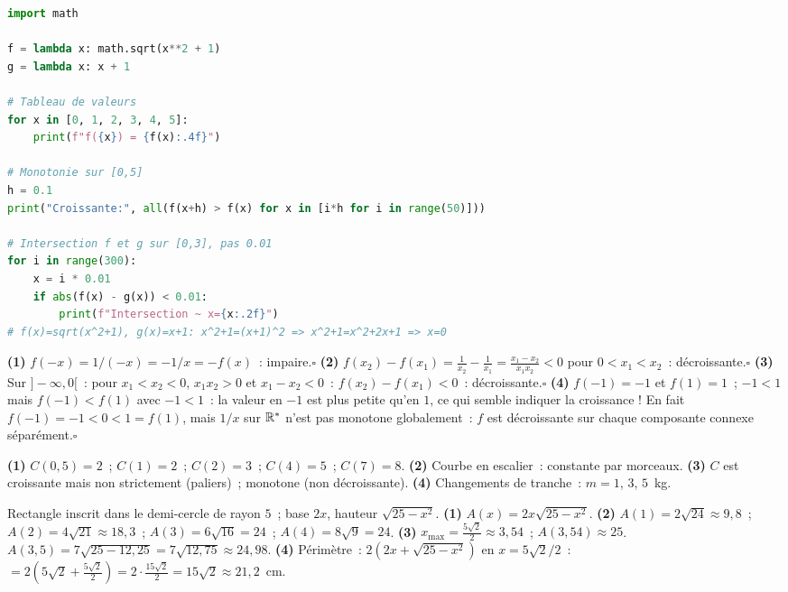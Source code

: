 
\begin{lstlisting}[language=Python]
import math

f = lambda x: math.sqrt(x**2 + 1)
g = lambda x: x + 1

# Tableau de valeurs
for x in [0, 1, 2, 3, 4, 5]:
    print(f"f({x}) = {f(x):.4f}")

# Monotonie sur [0,5]
h = 0.1
print("Croissante:", all(f(x+h) > f(x) for x in [i*h for i in range(50)]))

# Intersection f et g sur [0,3], pas 0.01
for i in range(300):
    x = i * 0.01
    if abs(f(x) - g(x)) < 0.01:
        print(f"Intersection ~ x={x:.2f}")
# f(x)=sqrt(x^2+1), g(x)=x+1: x^2+1=(x+1)^2 => x^2+1=x^2+2x+1 => x=0
\end{lstlisting}


\textbf{(1)} $f(-x)=1/(-x)=-1/x=-f(x)$~: impaire.\hfill$\square$
\textbf{(2)} $f(x_2)-f(x_1)=\frac{1}{x_2}-\frac{1}{x_1}=\frac{x_1-x_2}{x_1x_2}<0$ pour $0<x_1<x_2$~: d\'ecroissante.\hfill$\square$
\textbf{(3)} Sur $]-\infty,0[$~: pour $x_1<x_2<0$, $x_1x_2>0$ et $x_1-x_2<0$~:
$f(x_2)-f(x_1)<0$~: d\'ecroissante.\hfill$\square$
\textbf{(4)} $f(-1)=-1$ et $f(1)=1$~; $-1<1$ mais $f(-1)<f(1)$ avec $-1<1$~: la valeur en $-1$ est plus petite
qu'en $1$, ce qui semble indiquer la croissance ! En fait $f(-1)=-1<0<1=f(1)$, mais $1/x$ sur $\mathbb{R}^*$ n'est
pas monotone globalement~: $f$ est d\'ecroissante sur chaque composante connexe s\'epar\'ement.\hfill$\square$


\textbf{(1)} $C(0{,}5)=2$~; $C(1)=2$~; $C(2)=3$~; $C(4)=5$~; $C(7)=8$.
\textbf{(2)} Courbe en escalier~: constante par morceaux.
\textbf{(3)} $C$ est croissante mais non strictement (paliers)~; monotone (non d\'ecroissante).
\textbf{(4)} Changements de tranche~: $m=1$, $3$, $5$~kg.


Rectangle inscrit dans le demi-cercle de rayon $5$~; base $2x$, hauteur $\sqrt{25-x^2}$.
\textbf{(1)} $A(x)=2x\sqrt{25-x^2}$.
\textbf{(2)} $A(1)=2\sqrt{24}\approx9{,}8$~; $A(2)=4\sqrt{21}\approx18{,}3$~;
$A(3)=6\sqrt{16}=24$~; $A(4)=8\sqrt{9}=24$.
\textbf{(3)} $x_{\max}=\frac{5\sqrt{2}}{2}\approx3{,}54$~; $A(3{,}54)\approx25$.
$A(3{,}5)=7\sqrt{25-12{,}25}=7\sqrt{12{,}75}\approx24{,}98$.\checkmark
\textbf{(4)} P\'erim\`etre~: $2(2x+\sqrt{25-x^2})$ en $x=5\sqrt{2}/2$~:
$=2(5\sqrt{2}+\frac{5\sqrt{2}}{2})=2\cdot\frac{15\sqrt{2}}{2}=15\sqrt{2}\approx21{,}2$~cm.

